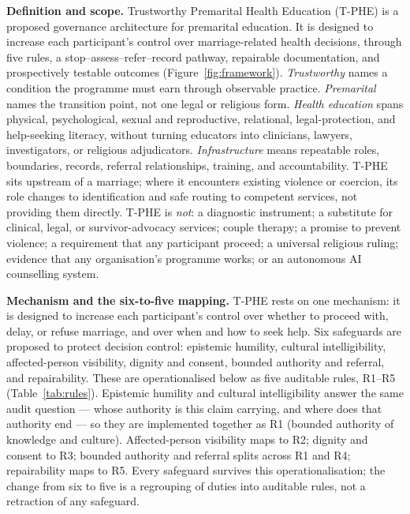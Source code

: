 \documentclass[11pt]{article}
\newcommand{\tphe}{T\mbox{-}PHE}
\begin{document}
\textbf{Definition and scope.} Trustworthy Premarital Health Education (\tphe) is a proposed governance architecture for premarital education. It is designed to increase each participant's control over marriage-related health decisions, through five rules, a stop--assess--refer--record pathway, repairable documentation, and prospectively testable outcomes (Figure~\ref{fig:framework}). \emph{Trustworthy} names a condition the programme must earn through observable practice. \emph{Premarital} names the transition point, not one legal or religious form. \emph{Health education} spans physical, psychological, sexual and reproductive, relational, legal-protection, and help-seeking literacy, without turning educators into clinicians, lawyers, investigators, or religious adjudicators. \emph{Infrastructure} means repeatable roles, boundaries, records, referral relationships, training, and accountability. \tphe{} sits upstream of a marriage; where it encounters existing violence or coercion, its role changes to identification and safe routing to competent services, not providing them directly. \tphe{} is \emph{not}: a diagnostic instrument; a substitute for clinical, legal, or survivor-advocacy services; couple therapy; a promise to prevent violence; a requirement that any participant proceed; a universal religious ruling; evidence that any organisation's programme works; or an autonomous AI counselling system.

\textbf{Mechanism and the six-to-five mapping.} \tphe{} rests on one mechanism: it is designed to increase each participant's control over whether to proceed with, delay, or refuse marriage, and over when and how to seek help. Six safeguards are proposed to protect decision control: epistemic humility, cultural intelligibility, affected-person visibility, dignity and consent, bounded authority and referral, and repairability. These are operationalised below as five auditable rules, R1--R5 (Table~\ref{tab:rules}). Epistemic humility and cultural intelligibility answer the same audit question --- whose authority is this claim carrying, and where does that authority end --- so they are implemented together as R1 (bounded authority of knowledge and culture). Affected-person visibility maps to R2; dignity and consent to R3; bounded authority and referral splits across R1 and R4; repairability maps to R5. Every safeguard survives this operationalisation; the change from six to five is a regrouping of duties into auditable rules, not a retraction of any safeguard.
\end{document}

